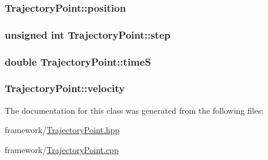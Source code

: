 \hypertarget{classTrajectoryPoint_a786f988c05632066d9759cf23c1b1ddf}{
\subsubsection[{position}]{ Trajectory\-Point\-::position\hspace{0.3cm}{\ttfamily [private]}}}\label{classTrajectoryPoint_a786f988c05632066d9759cf23c1b1ddf}
\hypertarget{classTrajectoryPoint_a11f7fb0c8a2742c89c761bc807ec6b2e}{
\subsubsection[{step}]{\setlength{\rightskip}{0pt plus 5cm}unsigned int Trajectory\-Point\-::step\hspace{0.3cm}{\ttfamily [private]}}}\label{classTrajectoryPoint_a11f7fb0c8a2742c89c761bc807ec6b2e}
\hypertarget{classTrajectoryPoint_a25fe1578e301cba61b31921ec98f7349}{
\subsubsection[{time\-S}]{\setlength{\rightskip}{0pt plus 5cm}double Trajectory\-Point\-::time\-S\hspace{0.3cm}{\ttfamily [private]}}}\label{classTrajectoryPoint_a25fe1578e301cba61b31921ec98f7349}
\hypertarget{classTrajectoryPoint_ab8782cac9ee57c49096bd94611b4d2d2}{
\subsubsection[{velocity}]{ Trajectory\-Point\-::velocity\hspace{0.3cm}{\ttfamily [private]}}}\label{classTrajectoryPoint_ab8782cac9ee57c49096bd94611b4d2d2}


The documentation for this class was generated from the following files\-:\begin{DoxyCompactItemize}
\item 
framework/\hyperlink{TrajectoryPoint_8hpp}{Trajectory\-Point.\-hpp}\item 
framework/\hyperlink{TrajectoryPoint_8cpp}{Trajectory\-Point.\-cpp}\end{DoxyCompactItemize}
